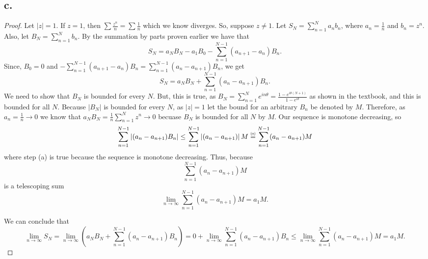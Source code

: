 \documentclass{article}
\newcommand\numeq[1]%
  {\stackrel{\scriptscriptstyle(\mkern-1.5mu#1\mkern-1.5mu)}{=}}
\begin{document}
\subsection*{c.}
\begin{proof}
Let $|z| = 1$. If $z = 1$, then $\sum \frac{z^n}{n} = \sum\frac{1}{n}$ which we know diverges. So, suppose $z \neq 1$. Let $S_N = \sum\limits_{n = 1}^N a_nb_n$, where $a_n = \frac{1}{n}$ and $b_n = z^n$. Also, let $B_N = \sum\limits_{n = 1}^N b_n$. By the summation by parts proven earlier we have that \[S_N = a_{N}B_{N} - a_1B_0 - \sum\limits_{n = 1}^{N - 1}(a_{n + 1}- a_n)B_n.
\]
Since, $B_0 = 0$ and $- \sum\limits_{n = 1}^{N - 1}(a_{n + 1}- a_n)B_n = \sum\limits_{n = 1}^{N - 1}(a_n - a_{n + 1})B_n$, we get 
\[
    S_N = a_{N}B_{N} + \sum\limits_{n = 1}^{N - 1}(a_n - a_{n + 1})B_n. 
\]
We need to show that $B_N$ is bounded for every $N$. But, this is true, as $B_N = \sum\limits_{n = 1}^{N}e^{in\theta} = \frac{1 - e^{i \theta(N + 1)}}{1 - e^{i \theta}}$ as shown in the textbook, and this is bounded for all $N$. 
Because $|B_N|$ is bounded for every $N$, as $|z| = 1$ let the bound for an arbitrary $B_n$ be denoted by $M$. Therefore, as $a_n = \frac{1}{n} \to 0$ we know that $a_NB_N = \frac{1}{n}\sum\limits_{n = 1}^Nz^n \to 0$ becuase $B_N$ is bounded for all $N$ by $M$. Our sequence is monotone decreasing, so 
\[
   \sum\limits_{n = 1}^{N - 1}\left|(a_n - a_{n + 1})B_n\right|  \leq \sum\limits_{n = 1}^{N - 1} \left|(a_n - a_{n + 1}) \right|M \numeq{a} \sum\limits_{n = 1}^{N - 1} (a_n - a_{n + 1})M
    \]
    where step (a) is true because the sequence is monotone decreasing. Thus, because 
    \[
        \sum\limits_{n = 1}^{N - 1} (a_n - a_{n + 1})M
        \]
    is a telescoping sum
    \[
        \lim\limits_{n \to \infty} \sum\limits_{n = 1}^{N - 1} (a_n - a_{n + 1})M = a_1M.
        \]

    We can conclude that 
    \[
        \lim\limits_{n \to \infty} S_N = \lim\limits_{n \to \infty} \left( a_{N}B_{N} + \sum\limits_{n = 1}^{N - 1}(a_n - a_{n + 1})B_n  \right)= 0 + \lim\limits_{n \to \infty} \sum\limits_{n = 1}^{N - 1}(a_n - a_{n + 1})B_n \leq \lim\limits_{n \to \infty} \sum\limits_{n = 1}^{N - 1}(a_n - a_{n + 1})M = a_1M.  
        \]
\end{proof}
\end{document}
